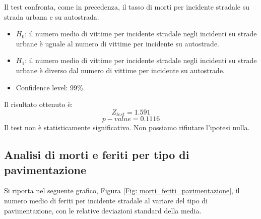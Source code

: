 \documentclass[12pt,a4paper,final,oneside]{article}			%
\begin{document}
        Il test confronta, come in precedenza, il tasso di morti per incidente stradale su strada urbana e su autostrada.
        \begin{itemize}
            \item $H_0$: il numero medio di vittime per incidente stradale negli incidenti su strade urbane è uguale al numero di vittime per incidente su autostrade.
            \item $H_1$:  il numero medio di vittime per incidente stradale negli incidenti su strade urbane è diverso dal numero di vittime per incidente su autostrade.
            \item Confidence level: 99\%.
        \end{itemize}
        Il risultato ottenuto è:
        \[
            Z_{test} = 1.591
        \]
        \[
            p-value = 0.1116
        \]
        Il test non è statisticamente significativo. Non possiamo rifiutare l’ipotesi nulla.
        
    \subsection{Analisi di morti e feriti per tipo di pavimentazione}
    
        Si riporta nel seguente grafico, Figura \ref{Fig: morti_feriti_pavimentazione}, il numero medio di feriti per incidente stradale al variare del tipo di pavimentazione, con le relative deviazioni standard della media.
        
\end{document}

